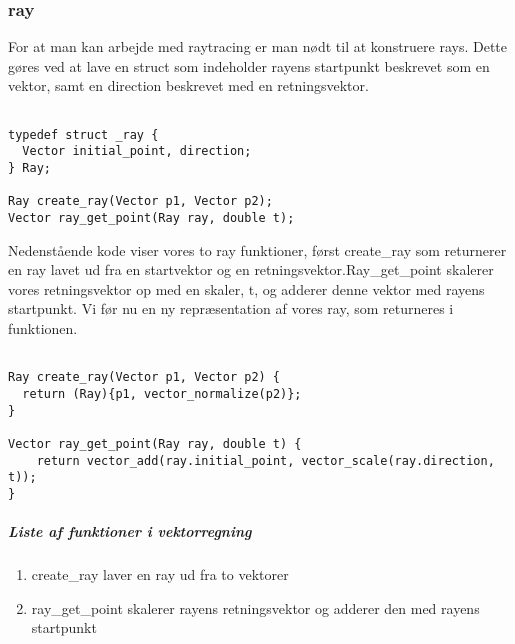 \subsubsection{ray}
For at man kan arbejde med raytracing er man nødt til at konstruere rays. Dette gøres ved at lave en struct som indeholder rayens startpunkt beskrevet som en vektor, samt en direction beskrevet med en retningsvektor. 

\begin{lstlisting}[style=Cstyle, caption=ray funktioner og struct]

typedef struct _ray {
  Vector initial_point, direction;
} Ray;

Ray create_ray(Vector p1, Vector p2);
Vector ray_get_point(Ray ray, double t);

\end{lstlisting}

Nedenstående kode viser vores to ray funktioner, først create\_ray som returnerer en ray lavet ud fra en startvektor og en retningsvektor.\newline Ray\_get\_point skalerer vores retningsvektor op med en skaler, t, og adderer denne vektor med rayens startpunkt. Vi før nu en ny repræsentation af vores ray, som returneres i funktionen.

\begin{lstlisting}[style=Cstyle, caption=funktionerne create\_ray og ray\_get\_point]

Ray create_ray(Vector p1, Vector p2) {
  return (Ray){p1, vector_normalize(p2)};
}

Vector ray_get_point(Ray ray, double t) {
    return vector_add(ray.initial_point, vector_scale(ray.direction, t));
}
\end{lstlisting}

\subparagraph{Liste af funktioner i vektorregning}
\begin{enumerate}
  
  \item create\_ray laver en ray ud fra to vektorer
  \item ray\_get\_point skalerer rayens retningsvektor og adderer den med rayens startpunkt
  
\end{enumerate}
